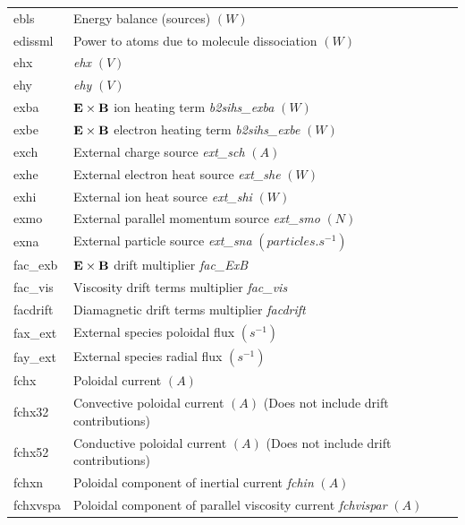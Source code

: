\documentclass[a4paper,10pt]{report}
\begin{document}
\begin{center}
\begin{longtable}{|l|l|}
    ebls     & \index{b2plot, ebls} Energy balance (sources) $(W)$ \\
    edissml  & \index{b2plot, edissml} Power to atoms due to molecule dissociation $(W)$ \\
    ehx      & \index{b2plot, ehx} {\em ehx} $(V)$ \\
    ehy      & \index{b2plot, ehy} {\em ehy} $(V)$ \\
    exba     & \index{b2plot, exba} ${\bf E} \times {\bf B}$ ion heating term {\em b2sihs\_exba} $(W)$ \\
    exbe     & \index{b2plot, exbe} ${\bf E} \times {\bf B}$ electron heating term {\em b2sihs\_exbe} $(W)$ \\
    exch     & \index{b2plot, exch} External charge source {\em ext\_sch} $(A)$ \\
    exhe     & \index{b2plot, exhe} External electron heat source {\em ext\_she} $(W)$ \\
    exhi     & \index{b2plot, exhi} External ion heat source {\em ext\_shi} $(W)$ \\
    exmo     & \index{b2plot, exmo} External parallel momentum source {\em ext\_smo} $(N)$ \\
    exna     & \index{b2plot, exna} External particle source {\em ext\_sna} $(particles.s^{-1})$ \\
    fac\_exb & \index{b2plot, fac\_exb} ${\bf E} \times {\bf B}$ drift multiplier {\em fac\_ExB} \\
    fac\_vis & \index{b2plot, fac\_vis} Viscosity drift terms multiplier {\em fac\_vis} \\
    facdrift & \index{b2plot, facdrift} Diamagnetic drift terms multiplier {\em facdrift} \\
    fax\_ext & \index{b2plot, fax\_ext} External species poloidal flux $(s^{-1})$ \\
    fay\_ext & \index{b2plot, fay\_ext} External species radial flux $(s^{-1})$ \\
    fchx     & \index{b2plot, fchx} Poloidal current $(A)$ \\
    fchx32   & \index{b2plot, fchx32} Convective poloidal current $(A)$ (Does not include drift contributions) \\
    fchx52   & \index{b2plot, fchx52} Conductive poloidal current $(A)$ (Does not include drift contributions) \\
    fchxn    & \index{b2plot, fchxn} Poloidal component of inertial current {\em fchin} $(A)$ \\
    fchxvspa & \index{b2plot, fchxvspa} Poloidal component of parallel viscosity current {\em fchvispar} $(A)$ \\

\end{longtable}
\end{center}
\end{document}
